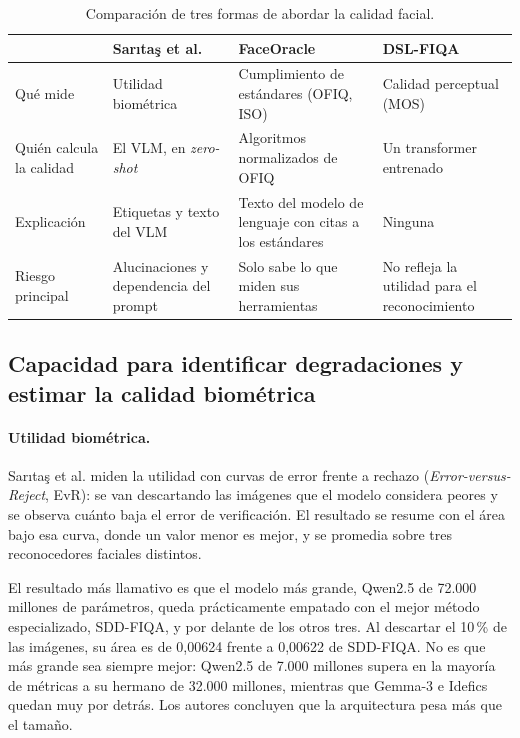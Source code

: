 \begin{table}[htbp]
\centering\small
\caption{Comparación de tres formas de abordar la calidad facial.}
\label{tab:enfoques}
\begin{tabularx}{\linewidth}{@{}>{\raggedright\arraybackslash}p{2.3cm}XXX@{}}
\toprule
& Sarıtaş et al.~\cite{Saritas_2026_FG} & FaceOracle~\cite{Kabbani_2024_ECCVW} & DSL-FIQA~\cite{Chen_2024_CVPR} \\
\midrule
Qué mide & Utilidad biométrica & Cumplimiento de estándares (OFIQ, ISO) & Calidad perceptual (MOS) \\
Quién calcula la calidad & El VLM, en \textit{zero-shot} & Algoritmos normalizados de OFIQ & Un transformer entrenado \\
Explicación & Etiquetas y texto del VLM & Texto del modelo de lenguaje con citas a los estándares & Ninguna \\
Riesgo principal & Alucinaciones y dependencia del prompt & Solo sabe lo que miden sus herramientas & No refleja la utilidad para el reconocimiento \\
\bottomrule
\end{tabularx}
\end{table}

\subsection{Capacidad para identificar degradaciones y estimar la calidad biométrica}
\label{sec:capacidad}
\paragraph{Utilidad biométrica.} Sarıtaş et al. miden la utilidad con curvas de error frente a rechazo (\textit{Error-versus-Reject}, EvR): se van descartando las imágenes que el modelo considera peores y se observa cuánto baja el error de verificación. El resultado se resume con el área bajo esa curva, donde un valor menor es mejor, y se promedia sobre tres reconocedores faciales distintos.

El resultado más llamativo es que el modelo más grande, Qwen2.5 de 72.000 millones de parámetros, queda prácticamente empatado con el mejor método especializado, SDD-FIQA, y por delante de los otros tres. Al descartar el 10\,\% de las imágenes, su área es de 0,00624 frente a 0,00622 de SDD-FIQA. No es que más grande sea siempre mejor: Qwen2.5 de 7.000 millones supera en la mayoría de métricas a su hermano de 32.000 millones, mientras que Gemma-3 e Idefics quedan muy por detrás. Los autores concluyen que la arquitectura pesa más que el tamaño.

